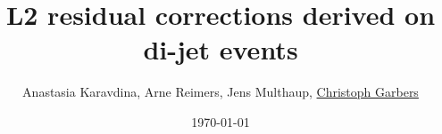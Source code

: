 \documentclass[t,compress]{beamer}
\title[L2 residual corrections]{L2 residual corrections derived on di-jet events}
\author[CHristoph Garbers]{Anastasia Karavdina, Arne Reimers, Jens Multhaup, \underline{Christoph Garbers}}
\institute[UHH]{University of Hamburg}
\date{\today}
\begin{document}
\begin{frame}
 \titlepage
\end{frame}
\end{document}
